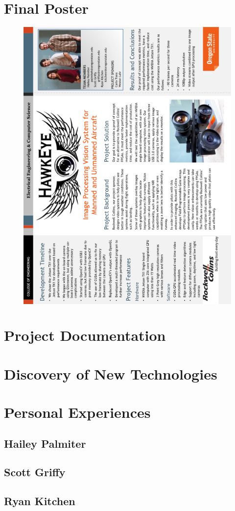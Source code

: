 \documentclass[letterpaper, onecolumn,10pt,draftclsnofoot]{IEEEtran}
\begin{document}
\section{Final Poster}
\begin{figure}[!ht] 
	\centering
	\includegraphics[width=\textwidth,height=\textheight,keepaspectratio]{images/HawkEye_Poster.png}  
	\end{figure}

\section{Project Documentation}

\section{Discovery of New Technologies}

\section{Personal Experiences}

	\subsection{Hailey Palmiter}
	
	\subsection{Scott Griffy}
	
	\subsection{Ryan Kitchen}
	
   
\end{document}
